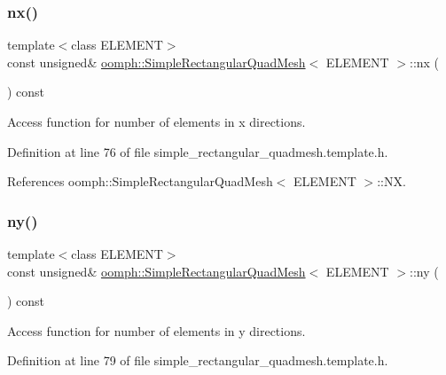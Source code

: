 \subsubsection{\texorpdfstring{nx()}{nx()}}
{\footnotesize\ttfamily template$<$class E\+L\+E\+M\+E\+NT$>$ \\
const unsigned\& \hyperlink{classoomph_1_1SimpleRectangularQuadMesh}{oomph\+::\+Simple\+Rectangular\+Quad\+Mesh}$<$ E\+L\+E\+M\+E\+NT $>$\+::nx (\begin{DoxyParamCaption}{ }\end{DoxyParamCaption}) const\hspace{0.3cm}{\ttfamily [inline]}}



Access function for number of elements in x directions. 



Definition at line 76 of file simple\+\_\+rectangular\+\_\+quadmesh.\+template.\+h.



References oomph\+::\+Simple\+Rectangular\+Quad\+Mesh$<$ E\+L\+E\+M\+E\+N\+T $>$\+::\+NX.

\mbox{\label{classoomph_1_1SimpleRectangularQuadMesh_a45011f22dedd480392b1f376e4269921}} 
\subsubsection{\texorpdfstring{ny()}{ny()}}
{\footnotesize\ttfamily template$<$class E\+L\+E\+M\+E\+NT$>$ \\
const unsigned\& \hyperlink{classoomph_1_1SimpleRectangularQuadMesh}{oomph\+::\+Simple\+Rectangular\+Quad\+Mesh}$<$ E\+L\+E\+M\+E\+NT $>$\+::ny (\begin{DoxyParamCaption}{ }\end{DoxyParamCaption}) const\hspace{0.3cm}{\ttfamily [inline]}}



Access function for number of elements in y directions. 



Definition at line 79 of file simple\+\_\+rectangular\+\_\+quadmesh.\+template.\+h.



